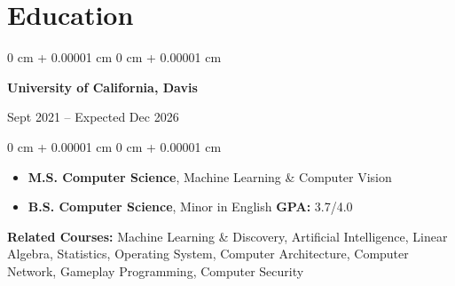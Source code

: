 \documentclass[10pt, letterpaper]{article}
\newenvironment{highlights}{
    \begin{itemize}[
        topsep=0.10 cm,
        parsep=0.10 cm,
        partopsep=0pt,
        itemsep=0pt,
        leftmargin=0 cm + 10pt
    ]
}{
    \end{itemize}
} %
\newenvironment{highlightsforbulletentries}{
    \begin{itemize}[
        topsep=0.10 cm,
        parsep=0.10 cm,
        partopsep=0pt,
        itemsep=0pt,
        leftmargin=10pt
    ]
}{
    \end{itemize}
} %
\newenvironment{onecolentry}{
    \begin{adjustwidth}{
        0 cm + 0.00001 cm
    }{
        0 cm + 0.00001 cm
    }
}{
    \end{adjustwidth}
} %
\newenvironment{twocolentry}[2][]{
    \onecolentry
    \def\secondColumn{#2}
    \setcolumnwidth{\fill, 6 cm}
    \begin{paracol}{2}
}{
    \switchcolumn \raggedleft \secondColumn
    \end{paracol}
    \endonecolentry
} %
\begin{document}
    









    \section{Education}



        
        \begin{twocolentry}{
            Sept 2021 – Expected Dec 2026
        }
            \textbf{University of California, Davis}
            
        \end{twocolentry}

        \vspace{0.10 cm}
        \begin{onecolentry}
            \begin{highlights}
                \item \textbf{M.S. Computer Science}, Machine Learning \& Computer Vision
                \item \textbf{B.S. Computer Science}, Minor in English \textbf{GPA: } 3.7/4.0%
            \end{highlights}
            \textbf{Related Courses: } Machine Learning \& Discovery, Artificial Intelligence, Linear Algebra, Statistics, Operating System, Computer Architecture, Computer Network, Gameplay Programming, Computer Security
        \end{onecolentry}
\end{document}
